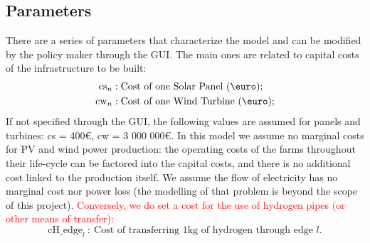\documentclass[english]{article}
\numberwithin{definition}{section}
\numberwithin{theorem}{section}
\numberwithin{problem}{section}
\begin{document}
\subsection{Parameters} \label{subsection: Parameters}
There are a series of parameters that characterize the model and can be modified by the policy maker through the GUI. The main ones are related to capital costs of the infrastructure to be built:
\begin{align*}
    \text{cs}_n & : \text{Cost of one Solar Panel (\euro);} \\
    \text{cw}_n & : \text{Cost of one Wind Turbine (\euro)}; 
\end{align*} %
If not specified through the GUI, the following values are assumed for panels and turbines: cs = 400\euro, cw = 3 000 000\euro. In this model we assume no marginal costs for PV and wind power production: the operating costs of the farms throughout their life-cycle can be factored into the capital costs, and there is no additional cost linked to the production itself. 
We assume the flow of electricity has no marginal cost nor power loss (the modelling of that problem is beyond the scope of this project). \textcolor{red}{Conversely, we do set a cost for the use of hydrogen pipes (or other means of transfer):}
\[
\text{cH\_edge}_l\ :\ \text{Cost of transferring 1kg of hydrogen through edge $l$}.
\]
\end{document}
